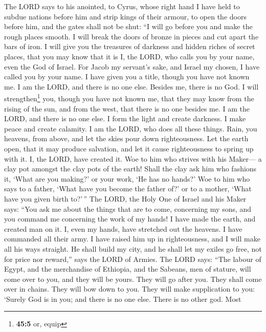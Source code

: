  The LORD says to his anointed, to Cyrus, whose right hand
I have held to subdue nations before him and strip kings of their
armour, to open the doors before him, and the gates shall not be shut:
 ``I will go before you and make the rough places smooth.
I will break the doors of bronze in pieces and cut apart the bars of
iron.  I will give you the treasures of darkness and
hidden riches of secret places, that you may know that it is I, the
LORD, who calls you by your name, even the God of Israel. 
For Jacob my servant's sake, and Israel my chosen, I have called you by
your name. I have given you a title, though you have not known me.
 I am the LORD, and there is no one else. Besides me,
there is no God. I will strengthen\footnote{\textbf{45:5} or, equip}
you, though you have not known me,  that they may know
from the rising of the sun, and from the west, that there is no one
besides me. I am the LORD, and there is no one else.  I
form the light and create darkness. I make peace and create calamity. I
am the LORD, who does all these things.  Rain, you
heavens, from above, and let the skies pour down righteousness. Let the
earth open, that it may produce salvation, and let it cause
righteousness to spring up with it. I, the LORD, have created it.
 Woe to him who strives with his Maker--- a clay pot
amongst the clay pots of the earth! Shall the clay ask him who fashions
it, `What are you making?' or your work, `He has no hands?'
 Woe to him who says to a father, `What have you become
the father of?' or to a mother, `What have you given birth to?'\,''
 The LORD, the Holy One of Israel and his Maker says:
``You ask me about the things that are to come, concerning my sons, and
you command me concerning the work of my hands!  I have
made the earth, and created man on it. I, even my hands, have stretched
out the heavens. I have commanded all their army.  I have
raised him up in righteousness, and I will make all his ways straight.
He shall build my city, and he shall let my exiles go free, not for
price nor reward,'' says the LORD of Armies.  The LORD
says: ``The labour of Egypt, and the merchandise of Ethiopia, and the
Sabeans, men of stature, will come over to you, and they will be yours.
They will go after you. They shall come over in chains. They will bow
down to you. They will make supplication to you: `Surely God is in you;
and there is no one else. There is no other god.  Most
